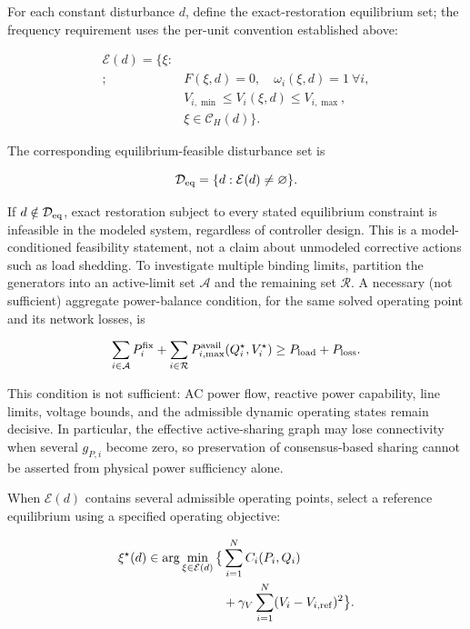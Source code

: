 \documentclass[11pt,twocolumn]{article}
\begin{document}
For each constant disturbance $d$, define the exact-restoration equilibrium set; the frequency requirement uses the per-unit convention established above:

\begin{equation}\label{eq:equilibria}
\begin{aligned}
\mathcal E(d)=\big\{\xi:\\;&F(\xi,d)=0,\quad \omega_i(\xi,d)=1\ \forall i,\\
&V_{i,\min}\leq V_i(\xi,d)\leq V_{i,\max},\\
&\xi\in\mathcal C_H(d)\big\}.
\end{aligned}
\end{equation}

The corresponding equilibrium-feasible disturbance set is

\begin{equation}\label{eq:deq}
\mathcal D_{\rm eq}=\{d:\mathcal E(d)\ne\varnothing\}.
\end{equation}

If $d\notin\mathcal D_{\rm eq}$, exact restoration subject to every stated equilibrium constraint is infeasible in the modeled system, regardless of controller design. This is a model-conditioned feasibility statement, not a claim about unmodeled corrective actions such as load shedding. To investigate multiple binding limits, partition the generators into an active-limit set $\mathcal A$ and the remaining set $\mathcal R$. A necessary (not sufficient) aggregate power-balance condition, for the same solved operating point and its network losses, is

\begin{equation}\label{eq:capacity-necessary}
\sum_{i\in\mathcal A}P_i^{\rm fix}
+\sum_{i\in\mathcal R}P_{i,\max}^{\rm avail}(Q_i^\star,V_i^\star)
\geq P_{\rm load}+P_{\rm loss}.
\end{equation}

This condition is not sufficient: AC power flow, reactive power capability, line limits, voltage bounds, and the admissible dynamic operating states remain decisive. In particular, the effective active-sharing graph may lose connectivity when several $g_{P,i}$ become zero, so preservation of consensus-based sharing cannot be asserted from physical power sufficiency alone.

When $\mathcal E(d)$ contains several admissible operating points, select a reference equilibrium using a specified operating objective:

\begin{equation}\label{eq:eqselection}
\begin{aligned}
\xi^\star(d)\in\arg\min_{\xi\in\mathcal E(d)}\big\{&
\sum_{i=1}^N C_i(P_i,Q_i)\\
&+\gamma_V\sum_{i=1}^N(V_i-V_{i,\rm ref})^2\big\}.
\end{aligned}
\end{equation}
\end{document}
